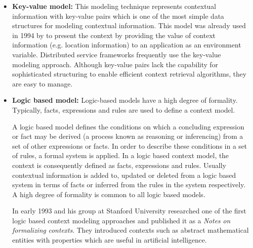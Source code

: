 \begin{itemize}
\item \textbf{Key-value model:}  This modeling technique represents contextual information with key-value pairs which is one of the most simple data structures for modeling contextual information. This model was already used in 1994 by \citeauthor{ieee512740} to present the context by providing the value of context information (e.g. location information) to an application as an environment variable. Distributed service frameworks  frequently use the key-value modeling approach. Although key-value pairs lack the capability for sophisticated structuring to enable efficient context retrieval algorithms, they are easy to manage.

\item \textbf{Logic based model: } %
Logic-based models have a high degree of formality. Typically, facts, expressions and rules are used to define a context model. \cite{BaldaufDustdarRosenberg07ijahuc}





A logic based model defines the conditions on which a concluding expression or fact may be derived (a process known as reasoning or inferencing) from a set of other expressions or facts. In order to describe these conditions in a set of rules, a formal system is applied. In a logic based context model, the context is consequently defined as facts, expressions and rules. Usually contextual information is added to, updated or deleted from a logic based system in terms of facts or inferred from the rules in the system respectively. A high degree of formality is common to all logic based models.\cite{Strang2004}

In early 1993 \citeauthor{McCarthy1993Notes} and his group at Stanford University researched one of the first logic based context modeling approaches and published it as a \textit{Notes on formalizing contexts}. They introduced contexts such as abstract mathematical entities with properties which are useful in artificial intelligence.



\end{itemize}
